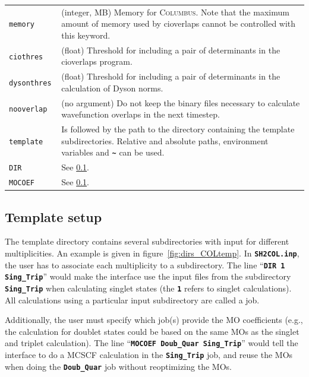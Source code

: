 \documentclass[a4paper,11pt,DIV=15,openany,twoside=false]{scrbook}
\newcommand{\ttt}[1]{\textbf{\texttt{#1}}}
\begin{document}
\begin{table}
\begin{tabular}{>{\tt}lp{12cm}}
memory          &(integer, MB) Memory for \textsc{Columbus}. Note that the maximum amount of memory used by cioverlaps cannot be controlled with this keyword.\\
ciothres        &(float) Threshold for including a pair of determinants in the cioverlaps program.\\
dysonthres      &(float) Threshold for including a pair of determinants in the calculation of Dyson norms.\\
nooverlap       &(no argument) Do not keep the binary files necessary to calculate wavefunction overlaps in the next timestep.\\
template        &Is followed by the path to the directory containing the template subdirectories. Relative and absolute paths, environment variables and \ttt{\textasciitilde} can be used.\\
DIR             &See \ref{int:col:template}.\\
MOCOEF          &See \ref{int:col:template}.\\
  \bottomrule
  \end{tabular}
\end{table}

\subsection{Template setup}\label{int:col:template}

The template directory contains several subdirectories with input for different multiplicities. An example is given in figure~\ref{fig:dirs_COLtemp}. In \ttt{SH2COL.inp}, the user has to associate each multiplicity to a subdirectory. The line ``\ttt{DIR 1 Sing\_Trip}'' would make the interface use the input files from the subdirectory \ttt{Sing\_Trip} when calculating singlet states (the \ttt{1} refers to singlet calculations). All calculations using a particular input subdirectory are called a job.

Additionally, the user must specify which job(s) provide the MO coefficients (e.g., the calculation for doublet states could be based on the same MOs as the singlet and triplet calculation). The line ``\ttt{MOCOEF Doub\_Quar Sing\_Trip}'' would tell the interface to do a MCSCF calculation in the \ttt{Sing\_Trip} job, and reuse the MOs when doing the \ttt{Doub\_Quar} job without reoptimizing the MOs.
\end{document}
